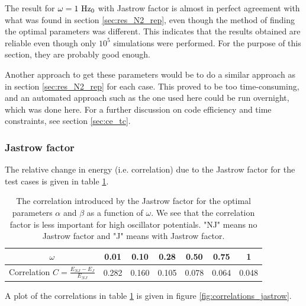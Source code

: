 The result for $\omega =1 ~\textrm{Hz}_0$ with Jastrow factor is almost in perfect agreement with what was found in section \ref{sec:res_N2_rep}, even though the method of finding the optimal parameters was different. 
This indicates that the results obtained are reliable even though only $10^5$ simulations were performed. For the purpose of this section, they are probably good enough. 

Another approach to get these parameters would be to do a similar approach as in section \ref{sec:res_N2_rep} for each case. 
This proved to be too time-consuming, and an automated approach such as the one used here could be run overnight, which was done here. 
For a further discussion on code efficiency and time constraints, see section \ref{sec:ce_tc}.



\subsubsection{Jastrow factor}\label{sec:res_jastrow}

The relative change in energy (i.e. correlation) due to the Jastrow factor for the test cases is given in table \ref{tab:correlations_jastrow}.

\begin{table}[h!]
	\centering
	\begin{tabular}{ccccccc}
	\toprule
	$\omega$	& 0.01 & 0.10 & 0.28 & 0.50 & 0.75 & 1 \\
	\midrule
	Correlation $C = \frac{E_{NJ} - E_{J}}{E_{NJ}}$ & 0.282 & 0.160 & 0.105 & 0.078 & 0.064 & 0.048 \\
	\bottomrule
	\end{tabular}
	\caption{The correlation introduced by the Jastrow factor for the optimal parameters $\alpha$ and $\beta$ as a function of $\omega$. 
	We see that the correlation factor is less important for high oscillator potentials.
	"NJ" means no Jastrow factor and "J" means with Jastrow factor.}
	\label{tab:correlations_jastrow}
\end{table}

A plot of the correlations in table \ref{tab:correlations_jastrow} is given in figure \ref{fig:correlations_jastrow}. 

